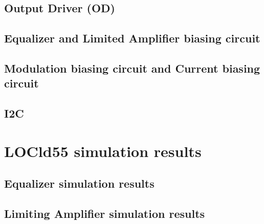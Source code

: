 \documentclass[11pt,a4paper]{article}
\begin{document}
\begin{spacing}{1.25}
\subsection{Output Driver (OD)}

\subsection{Equalizer and Limited Amplifier biasing circuit}

\subsection{Modulation biasing circuit and Current biasing circuit}

\subsection{I2C}

\section{LOCld55 simulation results}        %

\subsection{Equalizer simulation results}

\subsection{Limiting Amplifier simulation results}


\end{spacing}



\end{document}
